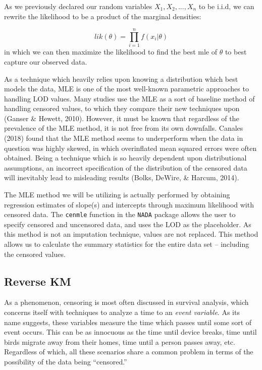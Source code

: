 \documentclass[12pt, twoside]{amherstthesis}
\begin{document}
As we previously declared our random variables \(X_1, X_2,...,X_n\) to be i.i.d, we can rewrite the likelihood to be a product of the marginal densities:

\[lik(\theta) = \prod_{i=1}^{n} f(x_i|\theta)\]
in which we can then maximize the likelihood to find the best mle of \(\theta\) to best capture our observed data.

As a technique which heavily relies upon knowing a distribution which best models the data, MLE is one of the most well-known parametric approaches to handling LOD values. Many studies use the MLE as a sort of baseline method of handling censored values, to which they compare their new techniques upon (Ganser \& Hewett, 2010). However, it must be known that regardless of the prevalence of the MLE method, it is not free from its own downfalls. Canales (2018) found that the MLE method seems to underperform when the data in question was highly skewed, in which overinflated mean squared errors were often obtained. Being a technique which is so heavily dependent upon distributional assumptions, an incorrect specification of the distribution of the censored data will inevitably lead to misleading results (Bolks, DeWire, \& Harcum, 2014).

The MLE method we will be utilizing is actually performed by obtaining regression estimates of slope(s) and intercepts through maximum likelihood with censored data. The \texttt{cenmle} function in the \texttt{NADA} package allows the user to specify censored and uncensored data, and uses the LOD as the placeholder. As this method is not an imputation technique, values are not replaced. This method allows us to calculate the summary statistics for the entire data set -- including the censored values.

\hypertarget{rkm}{%
\subsection{Reverse KM}\label{rkm}}

As a phenomenon, censoring is most often discussed in survival analysis, which concerns itself with techniques to analyze a time to an \emph{event variable}. As its name suggests, these variables measure the time which passes until some sort of event occurs. This can be as innocuous as the time until device breaks, time until birds migrate away from their homes, time until a person passes away, etc. Regardless of which, all these scenarios share a common problem in terms of the possibility of the data being ``censored.''
\end{document}
